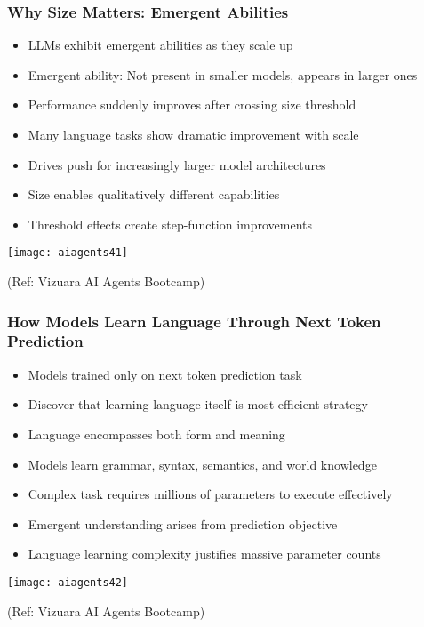 \begin{frame}[fragile]\frametitle{Why Size Matters: Emergent Abilities}
      \begin{itemize}
	  \item LLMs exhibit emergent abilities as they scale up
	  \item Emergent ability: Not present in smaller models, appears in larger ones
	  \item Performance suddenly improves after crossing size threshold
	  \item Many language tasks show dramatic improvement with scale
	  \item Drives push for increasingly larger model architectures
	  \item Size enables qualitatively different capabilities
	  \item Threshold effects create step-function improvements
	  \end{itemize}
	  
		\begin{center}
		\texttt{[image: aiagents41]}

		{\tiny (Ref: Vizuara AI Agents Bootcamp)}

		\end{center}	  
\end{frame}

\begin{frame}[fragile]\frametitle{How Models Learn Language Through Next Token Prediction}
      \begin{itemize}
	  \item Models trained only on next token prediction task
	  \item Discover that learning language itself is most efficient strategy
	  \item Language encompasses both form and meaning
	  \item Models learn grammar, syntax, semantics, and world knowledge
	  \item Complex task requires millions of parameters to execute effectively
	  \item Emergent understanding arises from prediction objective
	  \item Language learning complexity justifies massive parameter counts
	  \end{itemize}
	  
		\begin{center}
		\texttt{[image: aiagents42]}

		{\tiny (Ref: Vizuara AI Agents Bootcamp)}

		\end{center}		  
\end{frame}

